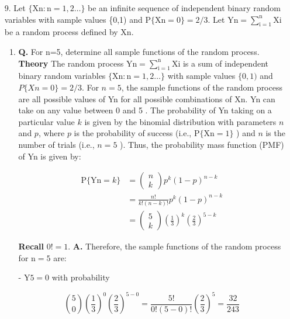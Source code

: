 \documentclass[main.tex]{subfiles}
\begin{document}
\begin{enumerate}
\begin{enumerate}
    \end{enumerate}

\item [9.] Let $\{\mathrm{Xn}: \mathrm{n}=1,2 \ldots\}$ be an infinite sequence of independent binary random variables with sample values \{0,1) and $\mathrm{P}\{\mathrm{Xn}=0\} = 2/3$. Let $\mathrm{Yn}=\sum_{\mathrm{i}=1}^{\mathrm{n}} \mathrm{Xi}$ be a random process defined by $\mathrm{Xn}$.

    \begin{enumerate}
        \item \textbf{Q.} For n=5, determine all sample functions of the random process. \textbf{Theory} The random process $\mathrm{Yn}=\sum_{\mathrm{i}=1}^{\mathrm{n}} \mathrm{Xi}$ is a sum of independent binary random variables $\{\mathrm{Xn}: \mathrm{n}=1,2 \ldots\}$ with sample values $\{0,1)$ and $P\{X n=0\}=2 / 3$. For $n=5$, the sample functions of the random process are all possible values of Yn for all possible combinations of $\mathrm{Xn}$. Yn can take on any value between 0 and 5 . The probability of Yn taking on a particular value $k$ is given by the binomial distribution with parameters $n$ and $p$, where $p$ is the probability of success (i.e., $\mathrm{P}\{\mathrm{Xn}=1\}$ ) and $n$ is the number of trials (i.e., $n=5$ ). Thus, the probability mass function (PMF) of Yn is given by:
        
        $$
        \begin{aligned}
        \mathrm{P}\{\mathrm{Yn}=k\} & =\left(\begin{array}{l}
        n \\
        k
        \end{array}\right) p^k(1-p)^{n-k} \\
        & = \frac{n !}{k !(n-k) !} p^k(1-p)^{n-k}\\ 
        & = \left(\begin{array}{l}
        5 \\
        k
        \end{array}\right)\left(\frac{1}{3}\right)^k\left(\frac{2}{3}\right)^{5-k}
        \end{aligned}
        $$

        \textbf{Recall} $0! = 1$. \textbf{A.} Therefore, the sample functions of the random process for $\mathrm{n}=5$ are:
        
        
        - $\mathrm{Y}5=0$ with probability 

        $$
        \binom{5}{0}\left(\frac{1}{3}\right)^0\left(\frac{2}{3}\right)^{5-0} = \frac{5 !}{0 !(5-0) !}\left(\frac{2}{3}\right)^5=\frac{32}{243}
        $$
        

\end{enumerate}
\end{enumerate}
\end{document}
